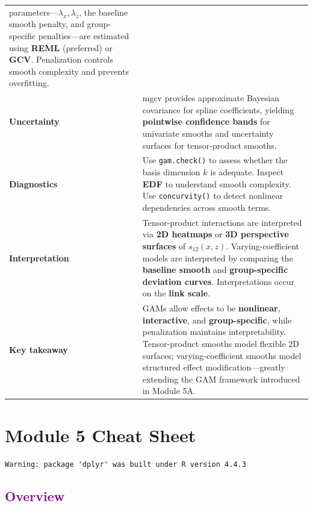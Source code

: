 \documentclass[
  letterpaper,
  DIV=11,
  numbers=noendperiod]{scrreprt}
\begin{document}
\begin{longtable}[]{@{}
  >{\raggedright\arraybackslash}p{}
  >{\raggedright\arraybackslash}p{}@{}}
parameters---\(\lambda_x,\lambda_z\), the baseline smooth penalty, and
group-specific penalties---are estimated using \textbf{REML} (preferred)
or \textbf{GCV}. Penalization controls smooth complexity and prevents
overfitting. \\
\textbf{Uncertainty} & mgcv provides approximate Bayesian covariance for
spline coefficients, yielding \textbf{pointwise confidence bands} for
univariate smooths and uncertainty surfaces for tensor-product
smooths. \\
\textbf{Diagnostics} & Use \texttt{gam.check()} to assess whether the
basis dimension \(k\) is adequate. Inspect \textbf{EDF} to understand
smooth complexity. Use \texttt{concurvity()} to detect nonlinear
dependencies across smooth terms. \\
\textbf{Interpretation} & Tensor-product interactions are interpreted
via \textbf{2D heatmaps} or \textbf{3D perspective surfaces} of
\(s_{12}(x,z)\). Varying-coefficient models are interpreted by comparing
the \textbf{baseline smooth} and \textbf{group-specific deviation
curves}. Interpretations occur on the \textbf{link scale}. \\
\textbf{Key takeaway} & GAMs allow effects to be \textbf{nonlinear},
\textbf{interactive}, and \textbf{group-specific}, while penalization
maintains interpretability. Tensor-product smooths model flexible 2D
surfaces; varying-coefficient smooths model structured effect
modification---greatly extending the GAM framework introduced in Module
5A. \\
\end{longtable}


\hypertarget{module-5-cheat-sheet}{%
\chapter*{Module 5 Cheat Sheet}\label{module-5-cheat-sheet}}


\begin{verbatim}
Warning: package 'dplyr' was built under R version 4.4.3
\end{verbatim}

\hypertarget{section-42}{%
\section*{\texorpdfstring{\textcolor{purple}{Overview}}{}}\label{section-42}}
\end{document}
